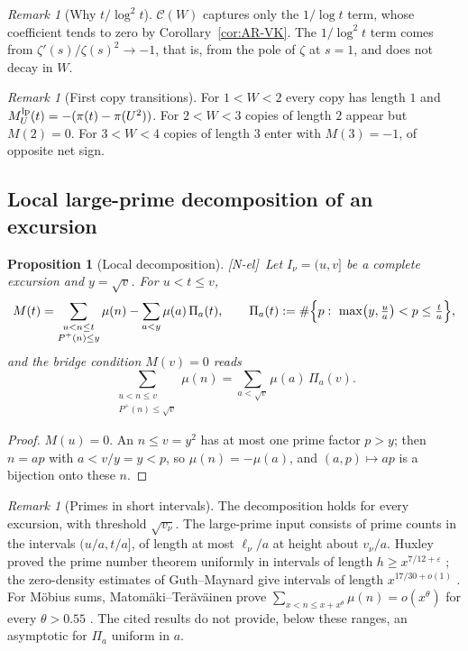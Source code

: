 \documentclass[11pt,reqno]{amsart}
\numberwithin{equation}{section}
\theoremstyle{plain}
\newtheorem{proposition}[theorem]{Proposition}
\theoremstyle{definition}
\theoremstyle{remark}
\newtheorem{remark}[theorem]{Remark}
\newcommand{\eps}{\varepsilon}
\newcommand{\Pp}{P^{+}}
\newcommand{\Cc}{\mathcal{C}}
\newcommand{\tagNE}{\textup{[N-el]}}
\begin{document}
\begin{remark}[Why $t/\log^2t$]
\label{rem:why_log2}
$\Cc(W)$ captures only the $1/\log t$ term, whose coefficient tends to zero
by Corollary~\ref{cor:AR-VK}. The $1/\log^2t$ term comes from
$\zeta'(s)/\zeta(s)^2\to-1$, that is, from the pole of $\zeta$ at $s=1$,
and does not decay in $W$.
\end{remark}

\begin{remark}[First copy transitions]
\label{rem:first-copy-transitions}
For $1<W<2$ every copy has length $1$ and $M^{\rm lp}_U(t)=-(\pi(t)-\pi(U^2))$. For
$2<W<3$ copies of length $2$ appear but $M(2)=0$. For $3<W<4$ copies of
length $3$ enter with $M(3)=-1$, of opposite net sign.
\end{remark}


\subsection{Local large-prime decomposition of an excursion}
\label{sec:local_large_prime}

\begin{proposition}[Local decomposition]
\label{prop:local_large_prime}
\tagNE\ Let $I_\nu=(u,v]$ be a complete excursion and $y=\sqrt v$. For $u<t\le v$,
\begin{equation}
\label{eq:local_split}
  M(t)=\sum_{\substack{u<n\le t\\ \Pp(n)\le y}}\mu(n)
  -\sum_{a<y}\mu(a)\,\Pi_a(t),\qquad
  \Pi_a(t):=\#\Bigl\{p:\ \max\bigl(y,\tfrac ua\bigr)<p\le\tfrac ta\Bigr\},
\end{equation}
and the bridge condition $M(v)=0$ reads
\begin{equation}
\label{eq:local_bridge}
  \sum_{\substack{u<n\le v\\ \Pp(n)\le\sqrt v}}\mu(n)
  =\sum_{a<\sqrt v}\mu(a)\,\Pi_a(v).
\end{equation}
\end{proposition}

\begin{proof}
$M(u)=0$. An $n\le v=y^2$ has at most one prime factor $p>y$; then
$n=ap$ with $a<v/y=y<p$, so $\mu(n)=-\mu(a)$, and $(a,p)\mapsto ap$ is a
bijection onto these $n$.
\end{proof}

\begin{remark}[Primes in short intervals]
\label{rem:local_meaning}
The decomposition holds for every excursion, with threshold $\sqrt{v_\nu}$.
The large-prime input consists of prime counts in the intervals
$(u/a,t/a]$, of length at most $\ell_\nu/a$ at height about $v_\nu/a$.
Huxley proved the prime number theorem uniformly in intervals of length
$h\ge x^{7/12+\eps}$ \cite{Huxley1972}; the zero-density estimates of
Guth--Maynard give intervals of length $x^{17/30+o(1)}$
\cite{GuthMaynard2026}. For M\"obius sums, Matom\"aki--Ter\"av\"ainen prove
$\sum_{x<n\le x+x^\theta}\mu(n)=o(x^\theta)$ for every $\theta>0.55$
\cite{MatomakiTeravainen2023}. The cited results do not provide, below these ranges, an asymptotic for
$\Pi_a$ uniform in $a$.
\end{remark}
\end{document}
